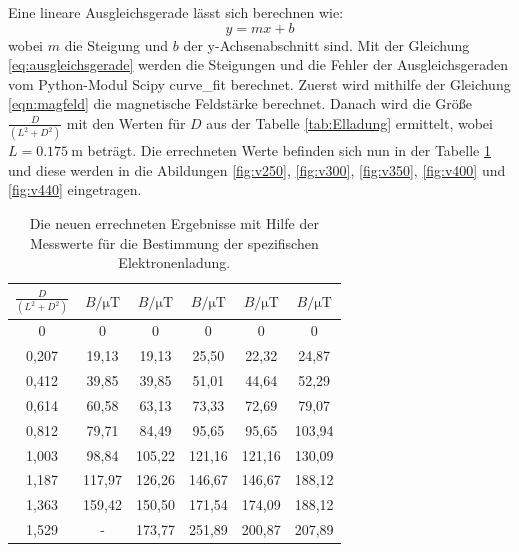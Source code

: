 Eine lineare Ausgleichsgerade lässt sich berechnen wie:
\begin{equation}
\label{eq:ausgleichsgerade}
y = mx + b
\end{equation}
wobei $m$ die Steigung und $b$ der y-Achsenabschnitt sind. Mit der Gleichung \ref{eq:ausgleichsgerade} werden die Steigungen und die Fehler der Ausgleichsgeraden vom Python-Modul Scipy curve\_fit berechnet.
Zuerst wird mithilfe der Gleichung \ref{eqn:magfeld} die magnetische Feldstärke berechnet. Danach wird die Größe $\frac{D}{(L^2+D^2)}$ mit den Werten für $D$ aus der Tabelle \ref{tab:Elladung} ermittelt, wobei $L = \SI{0,175}{\meter}$ beträgt. Die errechneten Werte befinden sich nun in der Tabelle \ref{tab:Neu} und diese werden in die Abildungen \ref{fig:v250}, \ref{fig:v300}, \ref{fig:v350}, \ref{fig:v400} und \ref{fig:v440} eingetragen.

\begin{table}[htbp]
	\centering
	\caption{Die neuen errechneten Ergebnisse mit Hilfe der Messwerte für die Bestimmung der spezifischen Elektronenladung.}
	\label{tab:Neu}
	\begin{tabular}{c c c c c c}
		\toprule
		$\frac{D}{(L^2+D^2)}$ & $B / \si{\micro\tesla}$ & $B / \si{\micro\tesla}$ & $B / \si{\micro\tesla}$ & $B / \si{\micro\tesla}$ & $B / \si{\micro\tesla}$ \\
		\midrule
		0	  & 0     &	0       &	0	& 0	& 0 \\
		0,207 &	19,13 &	19,13	& 25,50 &	22,32	& 24,87 \\
		0,412 &	39,85 &	39,85	& 51,01 &	44,64	& 52,29 \\
		0,614 &	60,58 &	63,13	& 73,33 &	72,69	& 79,07 \\
		0,812 &	79,71 &	84,49	& 95,65 &	95,65	& 103,94 \\
		1,003 &	98,84 &	105,22	& 121,16 &	121,16  &	130,09 \\
		1,187 &	117,97  & 126,26&	146,67 &	146,67 &	188,12 \\
		1,363 &	159,42	& 150,50&	171,54 &	174,09 &	188,12 \\
		1,529 &	- &	173,77 & 251,89&	200,87 &	207,89 \\
		\bottomrule
	\end{tabular}
\end{table}

